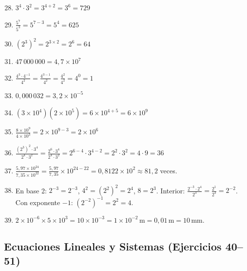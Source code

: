 \documentclass[12pt, letterpaper]{article}
\begin{document}
  \begin{enumerate}[leftmargin=*, label=\textbf{\arabic*.}]
    \setcounter{enumi}{27}
    \item $3^4 \cdot 3^2 = 3^{4+2} = 3^6 = 729$

    \item $\frac{5^7}{5^3} = 5^{7-3} = 5^4 = 625$

    \item $(2^3)^2 = 2^{3 \times 2} = 2^6 = 64$

    \item $47\,000\,000 = 4{,}7 \times 10^7$

    \item $\frac{4^3 \cdot 4^{-1}}{4^2} = \frac{4^{3-1}}{4^2} = \frac{4^2}{4^2} = 4^0 = 1$

    \item $0{,}000\,032 = 3{,}2 \times 10^{-5}$

    \item $(3 \times 10^4)(2 \times 10^5) = 6 \times 10^{4+5} = 6 \times 10^9$

    \item $\frac{8 \times 10^9}{4 \times 10^3} = 2 \times 10^{9-3} = 2 \times 10^6$

    \item $\frac{(2^3)^2 \cdot 3^4}{2^4 \cdot 3^2} = \frac{2^6 \cdot 3^4}{2^4 \cdot 3^2} = 2^{6-4} \cdot 3^{4-2} = 2^2 \cdot 3^2 = 4 \cdot 9 = 36$

    \item $\frac{5{,}97 \times 10^{24}}{7{,}35 \times 10^{22}} = \frac{5{,}97}{7{,}35} \times 10^{24-22} = 0{,}8122 \times 10^2 \approx 81{,}2$ veces.

    \item En base 2: $2^{-3} = 2^{-3}$, $4^2 = (2^2)^2 = 2^4$, $8 = 2^3$. Interior: $\frac{2^{-3} \cdot 2^4}{2^3} = \frac{2^1}{2^3} = 2^{-2}$. Con exponente $-1$: $(2^{-2})^{-1} = 2^2 = 4$.

    \item $2 \times 10^{-6} \times 5 \times 10^3 = 10 \times 10^{-3} = 1 \times 10^{-2}\,\text{m} = 0{,}01\,\text{m} = 10\,\text{mm}$.
  \end{enumerate}

  \subsection*{Ecuaciones Lineales y Sistemas (Ejercicios 40--51)}
\end{document}
